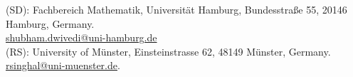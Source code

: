 \documentclass[10pt,a4paper,reqno]{article}
\theoremstyle{definition}
\numberwithin{equation}{section}
\begin{document}
\printbibliography 

\noindent
	(SD): Fachbereich Mathematik, Universität Hamburg, Bundesstraße 55, 20146 Hamburg, Germany.\\
	\href{mailto:shubham.dwivedi@uni-hamburg.de}{shubham.dwivedi@uni-hamburg.de}\\
	
	\noindent
	(RS): University of Münster, Einsteinstrasse 62, 48149 Münster, Germany. \\
	\href{ rsinghal@uni-muenster.de}{ rsinghal@uni-muenster.de}.
	


	
\end{document}
